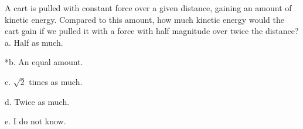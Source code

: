 
A cart is pulled with constant force over a given distance, gaining an amount of kinetic energy. Compared to this amount, how much kinetic energy would the cart gain if we pulled it with a force with half magnitude over twice the distance? \\

a. Half as much.

*b. An equal amount.

c. \( \sqrt{2} \) times as much.

d. Twice as much.

e. I do not know. \\

